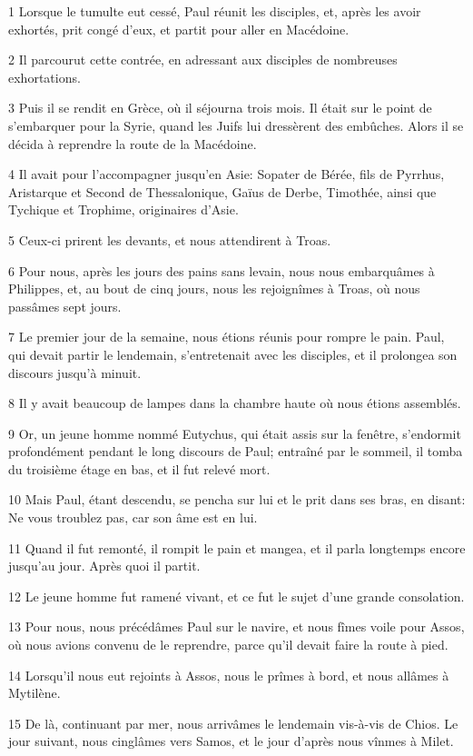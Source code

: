 \par 1 Lorsque le tumulte eut cessé, Paul réunit les disciples, et, après les avoir exhortés, prit congé d'eux, et partit pour aller en Macédoine.
\par 2 Il parcourut cette contrée, en adressant aux disciples de nombreuses exhortations.
\par 3 Puis il se rendit en Grèce, où il séjourna trois mois. Il était sur le point de s'embarquer pour la Syrie, quand les Juifs lui dressèrent des embûches. Alors il se décida à reprendre la route de la Macédoine.
\par 4 Il avait pour l'accompagner jusqu'en Asie: Sopater de Bérée, fils de Pyrrhus, Aristarque et Second de Thessalonique, Gaïus de Derbe, Timothée, ainsi que Tychique et Trophime, originaires d'Asie.
\par 5 Ceux-ci prirent les devants, et nous attendirent à Troas.
\par 6 Pour nous, après les jours des pains sans levain, nous nous embarquâmes à Philippes, et, au bout de cinq jours, nous les rejoignîmes à Troas, où nous passâmes sept jours.
\par 7 Le premier jour de la semaine, nous étions réunis pour rompre le pain. Paul, qui devait partir le lendemain, s'entretenait avec les disciples, et il prolongea son discours jusqu'à minuit.
\par 8 Il y avait beaucoup de lampes dans la chambre haute où nous étions assemblés.
\par 9 Or, un jeune homme nommé Eutychus, qui était assis sur la fenêtre, s'endormit profondément pendant le long discours de Paul; entraîné par le sommeil, il tomba du troisième étage en bas, et il fut relevé mort.
\par 10 Mais Paul, étant descendu, se pencha sur lui et le prit dans ses bras, en disant: Ne vous troublez pas, car son âme est en lui.
\par 11 Quand il fut remonté, il rompit le pain et mangea, et il parla longtemps encore jusqu'au jour. Après quoi il partit.
\par 12 Le jeune homme fut ramené vivant, et ce fut le sujet d'une grande consolation.
\par 13 Pour nous, nous précédâmes Paul sur le navire, et nous fîmes voile pour Assos, où nous avions convenu de le reprendre, parce qu'il devait faire la route à pied.
\par 14 Lorsqu'il nous eut rejoints à Assos, nous le prîmes à bord, et nous allâmes à Mytilène.
\par 15 De là, continuant par mer, nous arrivâmes le lendemain vis-à-vis de Chios. Le jour suivant, nous cinglâmes vers Samos, et le jour d'après nous vînmes à Milet.
